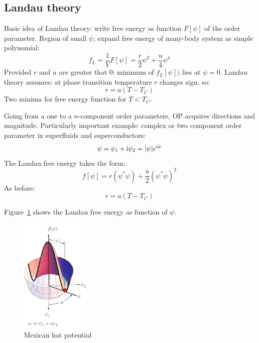 \documentclass[../main.tex]{subfiles}
\begin{document}
\subsection{Landau theory}

Basic idea of Landau theory: write free energy as function \(F[\psi]\) of the order parameter.
Region of small \(\psi\), expand free energy of many-body system as simple polynomial:
\begin{equation}
    f_{L} = \frac{1}{V} F[\psi] = \frac{r}{2} \psi^2 + \frac{u}{4} \psi^4
\end{equation}
Provided \(r\) and \(u\) are greater that \(0\): minimum of \(f_L [\psi])\) lies at \(\psi = 0\).
Landau theory assumes: at phase transition temperature \(r\) changes sign, so:
\begin{equation}
    r = a(T - T_C)
\end{equation}
Two minima for free energy function for \(T < T_C\).

Going from a one to a \(n\)-component order parameters, OP acquires directions and magnitude.
Particularly important example: complex or two component order parameter in superfluids and superconductors:
\begin{equation}
    \psi = \psi_1 + \mathrm{i} \psi_2 = \vert \psi \vert e^{\mathrm{i} \phi}
\end{equation}
The Landau free energy takes the form:
\begin{equation}
    f[\psi] = r(\psi^* \psi) + \frac{u}{2} (\psi^* \psi)^2
\end{equation}
As before:
\begin{equation}
    r = a(T - T_C)
\end{equation}

Figure~\ref{fig:Landau free energy mexican hat potential} shows the Landau free energy as function of \(\psi\).

\begin{figure}[t]
    \centering
    \includegraphics[width=0.3\textwidth]{images/landau free energy mexican hat}
    \caption{Mexican hat potential}
    \label{fig:Landau free energy mexican hat potential}
\end{figure}
\end{document}
